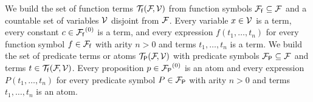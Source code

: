 
\begin{definition}
	We build the set of function {\myem terms }${{\mathcal T}_{\mathsf f}({\mathcal F}\!,{\mathcal V})}$ 
	from function symbols ${{\mathcal F}_{\mathsf f}} \subseteq {\mathcal F}$ and a
	countable set of {\myem variables }${\mathcal V}$ disjoint from ${\mathcal F}$\!.
	Every variable $x\in{\mathcal V}$ is a term,
	every constant $c\in{{\mathcal F}_{\mathsf f}}^{(0)}$ is a term, 
	and every expression $f(t_1,\ldots,t_n)$
	for every function symbol $f\in{{\mathcal F}_{\mathsf f}}$ 
	with arity $n>0$ 
	and terms $t_1,\ldots,t_n$
	is a term.
%	
	We build the set of predicate terms or {\myem atoms }${{\mathcal T}_{\mathsf P}({\mathcal F}\!,{\mathcal V})}$
	with predicate symbols ${{\mathcal F}_{\mathsf P}} \subseteq {\mathcal F}$ and terms $t\in{{\mathcal T}_{\mathsf f}({\mathcal F}\!,{\mathcal V})}$. 
	Every proposition $p\in{{\mathcal F}_{\mathsf P}}^{(0)}$ is an atom 
	and every expression $P(t_1,\ldots,t_n)$
	for every predicate symbol $P\in{{\mathcal F}_{\mathsf P}}$ with arity $n>0$ and terms $t_1,\ldots,t_n$ is an atom.
%
\end{definition}

